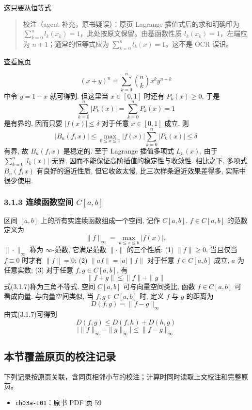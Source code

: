 \documentclass[
  10pt,
  fontset=fandol]{ctexart}
\providecommand{\tightlist}{%
  \setlength{\itemsep}{0pt}\setlength{\parskip}{0pt}}
\begin{document}
这只要从恒等式

\begin{quote}
校注（agent 补充，原书疑误）：原页 Lagrange 插值式后的求和明确印为 \(\sum_{k=0}^{n}l_k(x_k)=1\)，此处按原文保留。由基函数性质 \(l_k(x_k)=1\)，左端应为 \(n+1\)；通常的恒等式应为 \(\sum_{k=0}^{n}l_k(x)=1\)。这不是 OCR 误识。
\end{quote}

\href{../../source-images/pdf-060.jpeg}{查看原页}

\[
(x+y)^n = \sum_{k=0}^{n} \binom{n}{k} x^k y^{n-k} \tag{3.1.6}
\] 中令 \(y=1-x\) 就可得到. 但这里当 \(x \in [0,1]\) 时还有 \(P_k(x) \geqslant 0\), 于是 \[
\sum_{k=0}^{n} |P_k(x)| = \sum_{k=0}^{n} P_k(x) = 1
\] 是有界的, 因而只要 \(|f(x)| \leqslant \delta\) 对于任意 \(x \in [0,1]\) 成立, 则 \[
|B_n(f,x)| \leqslant \max_{0 \leqslant x \leqslant 1} |f(x)| \sum_{k=0}^{n} |P_k(x)| \leqslant \delta
\] 有界, 故 \(B_n(f,x)\) 是稳定的. 至于 Lagrange 插值多项式 \(L_n(x)\), 由于 \(\sum_{k=0}^{n} |l_k(x)|\) 无界, 因而不能保证高阶插值的稳定性与收敛性. 相比之下, 多项式 \(B_n(f,x)\) 有良好的逼近性质, 但它收敛太慢, 比三次样条逼近效果差得多, 实际中很少使用.

\subsubsection{\texorpdfstring{3.1.3 连续函数空间 \(C[a,b]\)}{3.1.3 连续函数空间 C{[}a,b{]}}}\label{ux8fdeux7eedux51fdux6570ux7a7aux95f4-cab}

区间 \([a,b]\) 上的所有实连续函数组成一个空间, 记作 \(C[a,b]\). \(f \in C[a,b]\) 的范数定义为 \[
\|f\|_\infty = \max_{a \leqslant x \leqslant b} |f(x)| ,
\] \(\|\cdot\|_\infty\) 称为 \(\infty\)-范数, 它满足范数 \(\|\cdot\|\) 的三个性质: (1) \(\|f\| \geqslant 0\), 当且仅当 \(f \equiv 0\) 时才有 \(\|f\| = 0\); (2) \(\|af\| = |a| \|f\|\) 对于任意 \(f \in C[a,b]\) 成立, \(a\) 为任意实数; (3) 对于任意 \(f,g \in C[a,b]\), 有 \[
\|f+g\| \leqslant \|f\| + \|g\| \tag{3.1.7}
\] 式(3.1.7)称为三角不等式. 空间 \(C[a,b]\) 可与向量空间类比, 函数 \(f \in C[a,b]\) 可看成向量. 与向量空间类似, 当 \(f,g \in C[a,b]\) 时, 定义 \(f\) 与 \(g\) 的距离为 \[
D(f,g) = \|f-g\|_\infty \tag{3.1.8}
\] 由式(3.1.7)可得到 \[
D(f,g) \leqslant D(f,h) + D(h,g) \tag{3.1.9}
\] \[
\bigl|\|f\|_\infty - \|g\|_\infty\bigr| \leqslant \|f-g\|_\infty \tag{3.1.10}
\]

\subsection{本节覆盖原页的校注记录}\label{ux672cux8282ux8986ux76d6ux539fux9875ux7684ux6821ux6ce8ux8bb0ux5f55}

下列记录按原页关联，含同页相邻小节的校注；计算时同时读取上文校注和完整原页。

\begin{itemize}
\tightlist
\item
  \texttt{ch03a-E01}：原书 PDF 页 59
\end{itemize}
\end{document}
